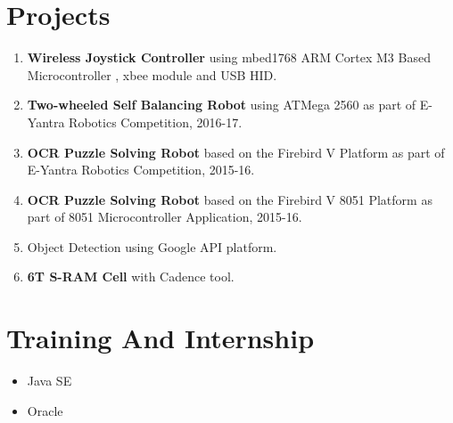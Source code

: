 \documentclass[margin,line]{res}
\begin{document}
\begin{resume}
\section{\sc Projects}
\begin{enumerate}
	\item \textbf{Wireless Joystick Controller} using mbed1768 ARM Cortex M3 Based Microcontroller , xbee module and USB HID.
	\item \textbf{Two-wheeled Self Balancing Robot} using ATMega 2560 as part of E-Yantra Robotics Competition, 2016-17.
	\item \textbf{OCR Puzzle Solving Robot} based on the Firebird V Platform as part of E-Yantra Robotics Competition, 2015-16.
	\item \textbf{OCR Puzzle Solving Robot} based on the Firebird V 8051 Platform as part of 8051 Microcontroller Application, 2015-16.	
	\item Object Detection using Google API platform.
	\item \textbf{6T S-RAM Cell} with Cadence tool.		    
\end{enumerate}

\section{\sc Training And Internship}
\begin{itemize}
	\item Java SE
	\item Oracle
\end{itemize}

\end{resume}
\end{document}
